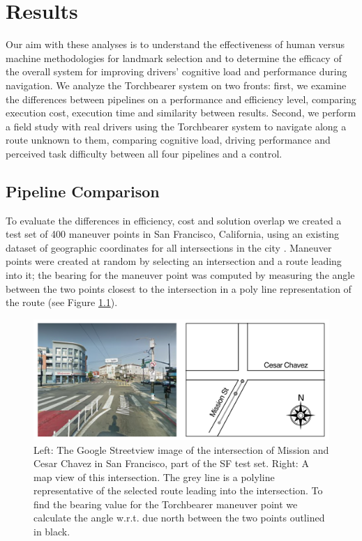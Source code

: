 \chapter{Results}\label{CH:results}

Our aim with these analyses is to understand the effectiveness of human versus machine methodologies for landmark selection and to determine the efficacy of the overall system for improving drivers' cognitive load and performance during navigation. We analyze the Torchbearer system on two fronts: first, we examine the differences between pipelines on a performance and efficiency level, comparing execution cost, execution time and similarity between results. Second, we perform a field study with real drivers using the Torchbearer system to navigate along a route unknown to them, comparing cognitive load, driving performance and perceived task difficulty between all four pipelines and a control.

\section{Pipeline Comparison}

To evaluate the differences in efficiency, cost and solution overlap we created a test set of 400 maneuver points in San Francisco, California, using an existing dataset of geographic coordinates for all intersections in the city \cite{sfIntersections}. Maneuver points were created at random by selecting an intersection and a route leading into it; the bearing for the maneuver point was computed by measuring the angle between the two points closest to the intersection in a poly line representation of the route (see Figure \ref{fig:polyline}).

\begin{figure}[htbp]
  \centering
  \includegraphics[width=\textwidth]{images/POLYLINE.png}
  \caption{Left: The Google Streetview image of the intersection of Mission and Cesar Chavez in San Francisco, part of the SF test set. Right: A map view of this intersection. The grey line is a polyline representative of the selected route leading into the intersection. To find the bearing value for the Torchbearer maneuver point we calculate the angle w.r.t. due north between the two points outlined in black.}
  \label{fig:polyline}
\end{figure}

